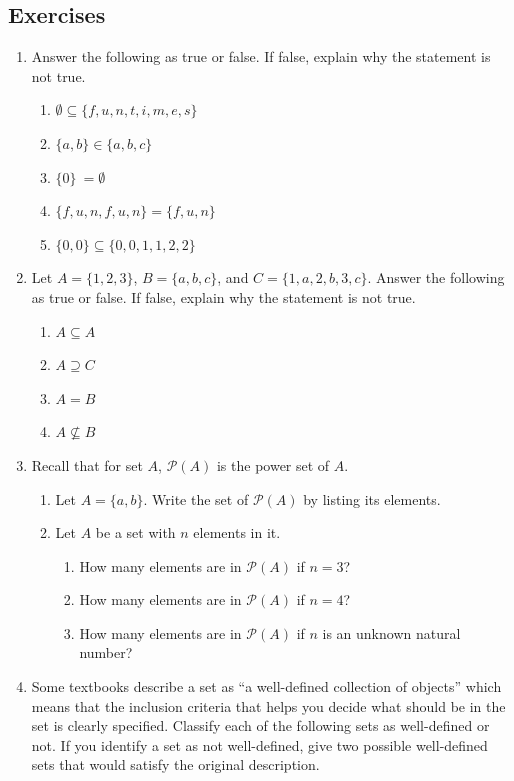 \documentclass[
]{book}
\theoremstyle{definition}
\theoremstyle{definition}
\theoremstyle{definition}
\theoremstyle{definition}
\theoremstyle{remark}
\begin{document}
\hypertarget{exercises-3}{%
\subsection{Exercises}\label{exercises-3}}

\begin{enumerate}
\def\labelenumi{\arabic{enumi}.}
\item
  Answer the following as true or false. If false, explain why the statement is not true.

  \begin{enumerate}
  \def\labelenumii{\alph{enumii}.}
  \item
    \(\emptyset \subseteq \{f,u,n,t,i,m,e,s\}\)
  \item
    \(\{a,b\} \in \{a,b,c\}\)
  \item
    \(\{0 \}\ = \emptyset\)
  \item
    \(\{f,u,n,f,u,n \}=\{f,u,n \}\)
  \item
    \(\{0,0\} \subseteq \{0,0,1,1,2,2\}\)
  \end{enumerate}
\item
  Let \(A=\{1, 2, 3\}\), \(B=\{a, b, c\}\), and \(C=\{1, a, 2, b, 3, c\}\). Answer the following as true or false. If false, explain why the statement is not true.

  \begin{enumerate}
  \def\labelenumii{\alph{enumii}.}
  \item
    \(A \subseteq A\)
  \item
    \(A\supseteq C\)
  \item
    \(A=B\)
  \item
    \(A \nsubseteq B\)
  \end{enumerate}
\item
  Recall that for set \(A\), \(\mathcal{P}(A)\) is the power set of \(A\).

  \begin{enumerate}
  \def\labelenumii{\alph{enumii}.}
  \item
    Let \(A=\{a,b\}\). Write the set of \(\mathcal{P}(A)\) by listing its elements.
  \item
    Let \(A\) be a set with \(n\) elements in it.

    \begin{enumerate}
    \def\labelenumiii{\roman{enumiii}.}
    \item
      How many elements are in \(\mathcal{P}(A)\) if \(n=3\)?
    \item
      How many elements are in \(\mathcal{P}(A)\) if \(n=4\)?
    \item
      How many elements are in \(\mathcal{P}(A)\) if \(n\) is an unknown natural number?
    \end{enumerate}
  \end{enumerate}
\item
  Some textbooks describe a set as ``a well-defined collection of objects'' which means that the inclusion criteria that helps you decide what should be in the set is clearly specified. Classify each of the following sets as well-defined or not. If you identify a set as not well-defined, give two possible well-defined sets that would satisfy the original description.


\end{enumerate}
\end{document}
